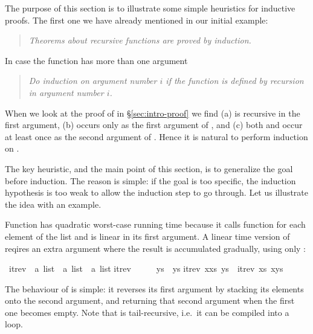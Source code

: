 %
\begin{isabellebody}%
\def\isabellecontext{Itrev}%
%
%
\begin{isamarkuptext}%
\label{sec:InductionHeuristics}
The purpose of this section is to illustrate some simple heuristics for
inductive proofs. The first one we have already mentioned in our initial
example:
\begin{quote}
\emph{Theorems about recursive functions are proved by induction.}
\end{quote}
In case the function has more than one argument
\begin{quote}
\emph{Do induction on argument number $i$ if the function is defined by
recursion in argument number $i$.}
\end{quote}
When we look at the proof of 
in \S\ref{sec:intro-proof} we find (a) \isa{{\isacharat}} is recursive in
the first argument, (b)  occurs only as the first argument of
\isa{{\isacharat}}, and (c) both  and  occur at least once as
the second argument of \isa{{\isacharat}}. Hence it is natural to perform induction
on .

The key heuristic, and the main point of this section, is to
generalize the goal before induction. The reason is simple: if the goal is
too specific, the induction hypothesis is too weak to allow the induction
step to go through. Let us illustrate the idea with an example.

Function  has quadratic worst-case running time
because it calls function \isa{{\isacharat}} for each element of the list and
\isa{{\isacharat}} is linear in its first argument.  A linear time version of
 reqires an extra argument where the result is accumulated
gradually, using only \isa{{\isacharhash}}:%
\end{isamarkuptext}%
\ itrev\ {\isacharcolon}{\isacharcolon}\ {\isachardoublequote}{\isacharprime}a\ list\ {\isasymRightarrow}\ {\isacharprime}a\ list\ {\isasymRightarrow}\ {\isacharprime}a\ list{\isachardoublequote}\isanewline
{}\isanewline
{\isachardoublequote}itrev\ {\isacharbrackleft}{\isacharbrackright}\ \ \ \ \ ys\ {\isacharequal}\ ys{\isachardoublequote}\isanewline
{\isachardoublequote}itrev\ {\isacharparenleft}x{\isacharhash}xs{\isacharparenright}\ ys\ {\isacharequal}\ itrev\ xs\ {\isacharparenleft}x{\isacharhash}ys{\isacharparenright}{\isachardoublequote}%
\begin{isamarkuptext}%
\noindent
The behaviour of  is simple: it reverses
its first argument by stacking its elements onto the second argument,
and returning that second argument when the first one becomes
empty. Note that  is tail-recursive, i.e.\ it can be
compiled into a loop.


\end{isamarkuptext}
\end{isabellebody}
